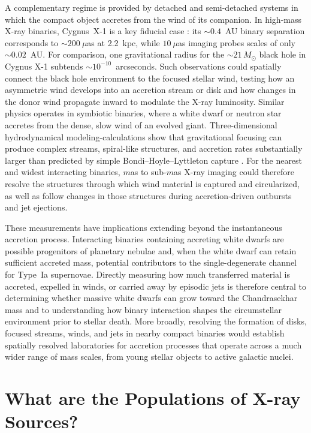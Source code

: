 \documentclass{article}
\begin{document}
A complementary regime is provided by detached and semi-detached systems in which the compact object accretes from the wind of its companion. In high-mass X-ray binaries, Cygnus~X-1 is a key fiducial case \cite{2021Sci...371.1046M}: its $\sim0.4$~AU binary separation corresponds to $\sim200~\mu$as at 2.2~kpc, while $10~\mu$as imaging probes scales of only $\sim0.02$~AU. For comparison, one gravitational radius for the $\sim21\,M_\odot$ black hole in Cygnus X-1 subtends $\sim10^{-10}$~arcseconds. Such observations could spatially connect the black hole environment to the focused stellar wind, testing how an asymmetric wind develops into an accretion stream or disk and how changes in the donor wind propagate inward to modulate the X-ray luminosity. Similar physics operates in symbiotic binaries, where a white dwarf or neutron star accretes from the dense, slow wind of an evolved giant. Three-dimensional hydrodynamical modeling-calculations show that gravitational focusing can produce complex streams, spiral-like structures, and accretion rates substantially larger than predicted by simple Bondi--Hoyle--Lyttleton capture \cite{2017MNRAS.468.3408D}. For the nearest and widest interacting binaries, $m$as to sub-$m$as X-ray imaging could therefore resolve the structures through which wind material is captured and circularized, as well as follow changes in those structures during accretion-driven outbursts and jet ejections.

These measurements have implications extending beyond the instantaneous accretion process. Interacting binaries containing accreting white dwarfs are possible progenitors of planetary nebulae and, when the white dwarf can retain sufficient accreted mass, potential contributors to the single-degenerate channel for Type~Ia supernovae. Directly measuring how much transferred material is accreted, expelled in winds, or carried away by episodic jets is therefore central to determining whether massive white dwarfs can grow toward the Chandrasekhar mass and to understanding how binary interaction shapes the circumstellar environment prior to stellar death. More broadly, resolving the formation of disks, focused streams, winds, and jets in nearby compact binaries would establish spatially resolved laboratories for accretion processes that operate across a much wider range of mass scales, from young stellar objects to active galactic nuclei.


\section{What are the Populations of X-ray Sources?} 
\label{sec:xray_pop}
\end{document}
